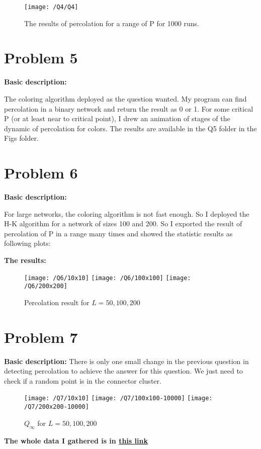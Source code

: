 \documentclass{article}
\begin{document}
    \begin{figure}[!htb]
        \centering
        \texttt{[image: /Q4/Q4]}
        \label{fig:4.1}
        \caption{The results of percolation for a range of P for 1000 runs.}
    \end{figure}

    \section*{Problem 5}
    \textbf{Basic description:}

    The coloring algorithm deployed as the question wanted.
    My program can find percolation in a binary network and return the result as 0 or 1.
    For some critical P (or at least near to critical point),
    I drew an animation of stages of the dynamic of percolation for colors.
    The results are available in the Q5 folder in the Figs folder.

    \section*{Problem 6}
    \textbf{Basic description:}

    For large networks, the coloring algorithm is not fast enough.
    So I deployed the H-K algorithm for a network of sizes 100 and 200.
    So I exported the result of percolation of P in a range many times and showed the statistic results as following plots:

    \textbf{The results:}
    \begin{figure}[!htb]
        \centering
        \texttt{[image: /Q6/10x10]}
        \label{fig:6.1}
        \texttt{[image: /Q6/100x100]}
        \label{fig:6.2}
        \texttt{[image: /Q6/200x200]}
        \label{fig:6.3}
        \caption{Percolation result for $L=50, 100, 200$}
    \end{figure}

    \pagebreak
    \section*{Problem 7}
    \textbf{Basic description:}
    There is only one small change in the previous question in detecting percolation to achieve the answer for this question. We just need to check if a random point is in the connector cluster.

    \begin{figure}[!htb]
        \centering
        \texttt{[image: /Q7/10x10]}
        \label{fig:7.1}
        \texttt{[image: /Q7/100x100-10000]}
        \label{fig:7.2}
        \texttt{[image: /Q7/200x200-10000]}
        \label{fig:7.3}
        \caption{$Q_{\infty}$ for $L=50, 100, 200$}
    \end{figure}

    \centering
    \textbf{The whole data I gathered is in \href{https://github.com/shahmari/ComputationalPhysics-Fall2021/tree/main/ProblemSet3/Data}{this link}}
\end{document}
